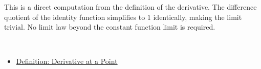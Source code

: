 \begin{remark*}
This is a direct computation from the definition of the derivative. The difference quotient of the identity function simplifies to $1$ identically, making the limit trivial. No limit law beyond the constant function limit is required.
\end{remark*}

\begin{remark*}[Dependencies]~\\
\begin{itemize}
  \item \hyperref[def:derivative-at-a-point]{Definition: Derivative at a Point}
\end{itemize}
\end{remark*}
